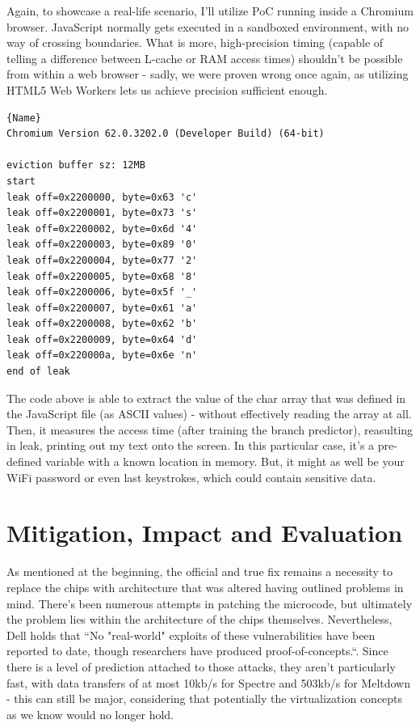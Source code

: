 \documentclass{article}
\begin{document}
Again, to showcase a real-life scenario, I'll utilize PoC running inside a Chromium browser. JavaScript normally gets executed in a sandboxed environment, with no way of crossing boundaries. What is more, high-precision timing (capable of telling a difference between L-cache or RAM access times) shouldn't be possible from within a web browser - sadly, we were proven wrong once again, as utilizing HTML5 Web Workers lets us achieve precision sufficient enough. 
\begin{lstlisting}[caption=Javascript leaking memory\cite{spectrechrome},frame=tlrb]{Name}
Chromium Version 62.0.3202.0 (Developer Build) (64-bit)

eviction buffer sz: 12MB
start
leak off=0x2200000, byte=0x63 'c'
leak off=0x2200001, byte=0x73 's'
leak off=0x2200002, byte=0x6d '4'
leak off=0x2200003, byte=0x89 '0'
leak off=0x2200004, byte=0x77 '2'
leak off=0x2200005, byte=0x68 '8' 
leak off=0x2200006, byte=0x5f '_'
leak off=0x2200007, byte=0x61 'a'
leak off=0x2200008, byte=0x62 'b'
leak off=0x2200009, byte=0x64 'd'
leak off=0x220000a, byte=0x6e 'n'
end of leak
\end{lstlisting}
The code above is able to extract the value of the char array that was defined in the JavaScript file (as ASCII values) - without effectively reading the array at all. Then, it measures the access time (after training the branch predictor), reasulting in leak, printing out my text onto the screen. In this particular case, it's a pre-defined variable with a known location in memory. But, it might as well be your WiFi password or even last keystrokes, which could contain sensitive data. 

\section{Mitigation, Impact and Evaluation}
As mentioned at the beginning, the official and true fix remains a necessity to replace the chips with architecture that was altered having outlined problems in mind. There's been numerous attempts in patching the microcode, but ultimately the problem lies within the architecture of the chips themselves. Nevertheless, Dell holds that ``No "real-world" exploits of these vulnerabilities have been reported to date, though researchers have produced proof-of-concepts.``\cite{dell}. Since there is a level of prediction attached to those attacks, they aren't particularly fast, with data transfers of at most 10kb/s for Spectre and 503kb/s for Meltdown \cite{kocher2018spectre}\cite{lipp2018meltdown} - this can still be major, considering that potentially the virtualization concepts as we know would no longer hold.
\end{document}
